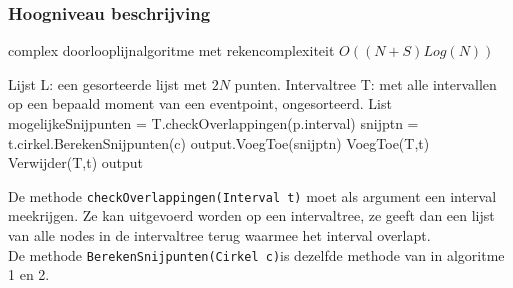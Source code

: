 \documentclass[11pt,a4paper]{article}
\begin{document}
\subsubsection{Hoogniveau beschrijving}
\begin{algorithm}[H]
\caption{complex doorlooplijnalgoritme met rekencomplexiteit $O((N+S)Log(N))$}
\begin{algorithmic}
\State Lijst L: een gesorteerde lijst met $2N$ punten.
\State Intervaltree T: met alle intervallen op een bepaald moment van een eventpoint, ongesorteerd.
\State List mogelijkeSnijpunten = T.checkOverlappingen(p.interval)
	\State snijptn = t.cirkel.BerekenSnijpunten(c)
	\State output.VoegToe(snijptn)
	\State VoegToe(T,t)
	\EndFor
\Else
\State Verwijder(T,t)
\EndIf
\EndFor
\Return output
\end{algorithmic}
\end{algorithm}
De methode \verb|checkOverlappingen(Interval t)| moet als argument een interval meekrijgen. Ze kan uitgevoerd worden op een intervaltree, ze geeft dan een lijst van alle nodes in de intervaltree terug waarmee het interval overlapt.\\
De methode \verb|BerekenSnijpunten(Cirkel c)|is dezelfde methode van in algoritme 1 en 2.
\end{document}
